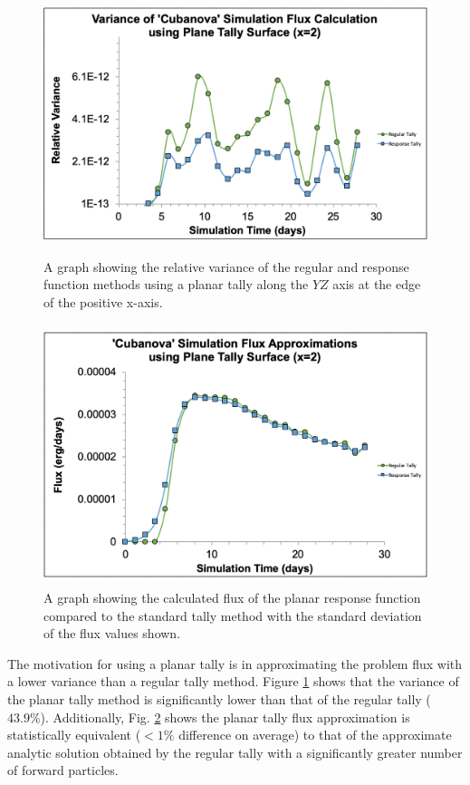 \begin{figure} [h!]
	\centering
	\includegraphics[height=3in]{VarReduction/plots/plane_response_var.png}
	\caption{A graph showing the relative variance of the regular and response function methods using a planar tally along the $YZ$ axis at the edge of the positive x-axis.}
	\label{fig:plane_response_var}
\end{figure}

\begin{figure} [h!]
	\centering
	\includegraphics[height=3in]{VarReduction/plots/plane_avg_error.png}
	\caption{A graph showing the calculated flux of the planar response function compared to the standard tally method with the standard deviation of the flux values shown. }
	\label{fig:plane_avg_flux}
\end{figure}

The motivation for using a planar tally is in approximating the problem flux with a lower variance than a regular tally method. Figure \ref{fig:plane_response_var} shows that the variance of the planar tally method is significantly lower than that of the regular tally ($43.9\%$).  Additionally, Fig. \ref{fig:plane_avg_flux} shows the planar tally flux approximation is statistically equivalent ($<1\%$ difference on average) to that of the approximate analytic solution obtained by the regular tally with a significantly greater number of forward particles. 

